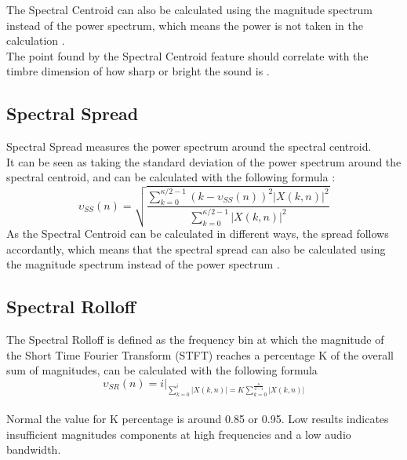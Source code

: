 The Spectral Centroid can also be calculated using the magnitude spectrum instead of the power spectrum, which means the power is not taken in the calculation \citep{ACA}.
\\
The point found by the Spectral Centroid feature should correlate with the timbre dimension of how sharp or bright the sound is \citep{ACA}. 

\subsection{Spectral Spread}
Spectral Spread measures the power spectrum around the spectral centroid.\\ 
It can be seen as taking the standard deviation of the power spectrum around the spectral centroid, and can be calculated with the following formula \citep{ACA}:
\begin{equation}
	\upsilon_{SS}(n)=\sqrt{\frac{\displaystyle\sum_{k = 0}^{\kappa/2-1}(k-\upsilon_{SS}(n))^2\vert X(k,n)\vert^2}{\displaystyle\sum_{k = 0}^{\kappa/2-1}\vert X(k,n)\vert^2}}
\end{equation}
As the Spectral Centroid can be calculated in different ways, the spread follows accordantly, which means that the spectral spread can also be calculated using the magnitude spectrum instead of the power spectrum \citep{ACA}.

\subsection{Spectral Rolloff}
The Spectral Rolloff is defined as the frequency bin at which the magnitude of the Short Time Fourier Transform (STFT) reaches a percentage K of the overall sum of magnitudes, can be calculated with the following formula \citep{ACA}\\
\begin{equation}\label{ eq:normal spectral rolloff}
	\upsilon_{SR}(n) = i \vert _{\displaystyle\sum_{k = 0}^i \vert X(k, n) \vert = K  \displaystyle\sum_{k = 0}^ {\frac{\kappa}{2-1}}\vert X(k, n) \vert}
\end{equation}
\\
Normal the value for K percentage is around 0.85 or 0.95. Low results indicates insufficient magnitudes components at high frequencies and a low audio bandwidth\citep{ACA}.\\


